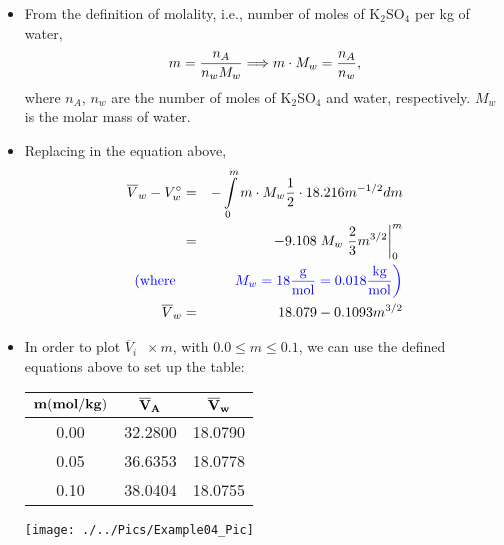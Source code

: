 \begin{enumerate}[1)]
\begin{itemize}
  \item From the definition of molality, i.e., number of moles of K$_{2}$SO$_{4}$ per kg of water,
       \begin{displaymath}
           m = \displaystyle\frac{n_{A}}{n_{w}M_{w}} \Longrightarrow m\cdot M_{w} = \displaystyle\frac{n_{A}}{n_{w}},
       \end{displaymath}
       where $n_{A}$, $n_{w}$ are the number of moles of K$_{2}$SO$_{4}$ and water, respectively. $M_{w}$ is the molar mass of water.

  \item Replacing in the equation above, 
      \begin{eqnarray}
         \overline{V}_{w} - V_{w}^{\circ} &=& -\int\limits_{0}^{m} m\cdot M_{w} \displaystyle\frac{1}{2}\cdot 18.216 m^{-1/2} dm \nonumber \\
                                       &=& -9.108\; M_{w} \left. \displaystyle\frac{2}{3} m^{3/2}\right|_{0}^{m} \nonumber \\
         \textcolor{blue}{\left(\text{where }\right.}&& \textcolor{blue}{\left. M_{w} = 18 \displaystyle\frac{\text{g}}{\text{mol}} = 0.018 \displaystyle\frac{\text{kg}}{\text{mol}}\right)} \nonumber \\
         \overline{V}_{w} &=&  18.079 - 0.1093 m^{3/2} \nonumber 
      \end{eqnarray}

  \item In order to plot $\overline{V}_{i}\;\;\times m$, with $0.0\leq m\leq 0.1$, we can use the defined equations above to set  up the table:  
        \begin{center}
          \begin{tabular}{|c | c c |}
            \hline
            ${\bf m (mol/kg)}$ & ${\bf \overline{V}_{A}}$ & ${\bf \overline{V}_{w}}$ \\
            \hline
              0.00  & 32.2800 &  18.0790 \\
              0.05  & 36.6353 &  18.0778 \\
              0.10  & 38.0404 &  18.0755 \\
             \hline
          \end{tabular}
        \end{center}
          \begin{center}
              \texttt{[image: ./../Pics/Example04\_Pic]}
          \end{center}
\end{itemize}


\clearpage
            

\end{enumerate}
